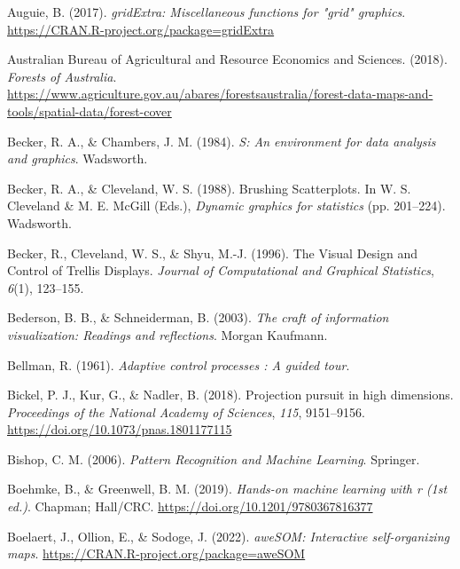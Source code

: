 \documentclass[
  letterpaper,
]{krantz}
\newlength{\cslhangindent}
\newlength{\cslentryspacingunit} %
\newenvironment{CSLReferences}[2] %
 {%
  \setlength{\parindent}{0pt}
  \ifodd #1
  \let\oldpar\par
  \def\par{\hangindent=\cslhangindent\oldpar}
  \fi
  \setlength{\parskip}{#2\cslentryspacingunit}
 }%
 {}
\begin{document}
\begin{CSLReferences}{1}{0}
\leavevmode{}%
Auguie, B. (2017). \emph{gridExtra: Miscellaneous functions for "grid"
graphics}. \url{https://CRAN.R-project.org/package=gridExtra}

\leavevmode{}%
Australian Bureau of Agricultural and Resource Economics and Sciences.
(2018). \emph{{Forests of Australia}}.
\url{https://www.agriculture.gov.au/abares/forestsaustralia/forest-data-maps-and-tools/spatial-data/forest-cover}

\leavevmode{}%
Becker, R. A., \& Chambers, J. M. (1984). \emph{{S}: An environment for
data analysis and graphics}. Wadsworth.

\leavevmode{}%
Becker, R. A., \& Cleveland, W. S. (1988). {B}rushing {S}catterplots. In
W. S. Cleveland \& M. E. McGill (Eds.), \emph{Dynamic graphics for
statistics} (pp. 201--224). Wadsworth.

\leavevmode{}%
Becker, R., Cleveland, W. S., \& Shyu, M.-J. (1996). {T}he {V}isual
{D}esign and {C}ontrol of {T}rellis {D}isplays. \emph{Journal of
Computational and Graphical Statistics}, \emph{6}(1), 123--155.

\leavevmode{}%
Bederson, B. B., \& Schneiderman, B. (2003). \emph{The craft of
information visualization: Readings and reflections}. Morgan Kaufmann.

\leavevmode{}%
Bellman, R. (1961). \emph{Adaptive control processes : A guided tour}.

\leavevmode{}%
Bickel, P. J., Kur, G., \& Nadler, B. (2018). Projection pursuit in high
dimensions. \emph{Proceedings of the National Academy of Sciences},
\emph{115}, 9151--9156. \url{https://doi.org/10.1073/pnas.1801177115}

\leavevmode{}%
Bishop, C. M. (2006). \emph{Pattern {R}ecognition and {M}achine
{L}earning}. Springer.

\leavevmode{}%
Boehmke, B., \& Greenwell, B. M. (2019). \emph{Hands-on machine learning
with r (1st ed.)}. Chapman; Hall/CRC.
\url{https://doi.org/10.1201/9780367816377}

\leavevmode{}%
Boelaert, J., Ollion, E., \& Sodoge, J. (2022). \emph{aweSOM:
Interactive self-organizing maps}.
\url{https://CRAN.R-project.org/package=aweSOM}


\end{CSLReferences}
\end{document}
